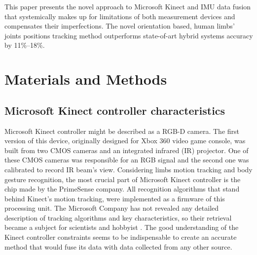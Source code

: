 \documentclass[sensors,article,submit,moreauthors,pdftex,10pt,a4paper]{mdpi}
\begin{document}
This paper presents the novel approach to Microsoft Kinect and IMU data fusion that systemically makes up for limitations of both measurement devices and compensates their imperfections. The novel orientation based, human limbs’ joints positions tracking method outperforms state-of-art hybrid systems accuracy by 11\%--18\%.

\section{Materials and Methods}



\subsection{Microsoft Kinect controller characteristics}
Microsoft Kinect controller might be described as a RGB-D camera. The first version of this device, originally designed for Xbox 360 video game console, was built from two CMOS cameras and an integrated infrared (IR) projector. One of these CMOS cameras was responsible for an RGB signal and the second one was calibrated to record IR beam’s view. Considering limbs motion tracking and body gesture recognition, the most crucial part of Microsoft Kinect controller is the chip made by the PrimeSense company. All recognition algorithms that stand behind Kinect’s motion tracking, were implemented as a firmware of this processing unit. 
The Microsoft Company has not revealed any detailed description of tracking algorithms and key characteristics, so their retrieval became a subject for scientists and hobbyist \cite{Skalski2015,Gonzalez-Jorge2013,Khoshelham2012}. The good understanding of the Kinect controller constraints seems to be indispensable to create an accurate method that would fuse its data with data collected from any other source. 
\end{document}
